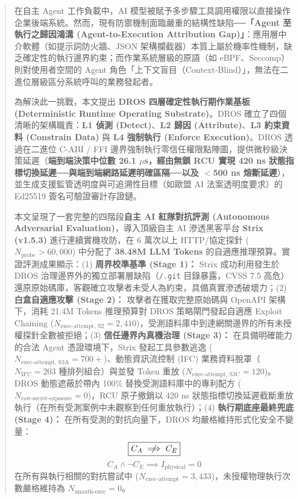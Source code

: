 \documentclass[conference]{IEEEtran}
\begin{document}
\begin{abstract}
在自主 Agent 工作負載中，AI 模型被賦予多步驟工具調用權限以直接操作企業後端系統。然而，現有防禦機制面臨嚴重的結構性缺陷──\textbf{「Agent 至執行之歸因鴻溝 (Agent-to-Execution Attribution Gap)」}：應用層中介軟體（如提示詞防火牆、JSON 架構攔截器）本質上屬於機率性機制，缺乏確定性的執行邊界約束；而作業系統層級的原語（如 eBPF、Seccomp）則對使用者空間的 Agent 角色「上下文盲目（Context-Blind）」，無法在二進位層級區分系統呼叫的業務發起者。

為解決此一挑戰，本文提出 \textbf{DROS 四層確定性執行期作業基板 (Deterministic Runtime Operating Substrate)}。DROS 確立了四個清晰的架構職責：\textbf{L1 偵測 (Detect)}、\textbf{L2 歸因 (Attribute)}、\textbf{L3 約束資料 (Constrain Data)} 與 \textbf{L4 強制執行 (Enforce Execution)}。DROS 透過在二進位 C-ABI / FFI 邊界強制執行零信任權限點陣圖，提供微秒級決策延遲（\textbf{端到端決策中位數 26.1 $\mu$s，經由無鎖 RCU 實現 420 ns 狀態指標切換延遲──與端到端網路延遲明確區隔──以及 $<$500 ns 熔斷延遲}），並生成支援監管透明度與可追溯性目標（如歐盟 AI 法案透明度要求）的 Ed25519 簽名可驗證審計存證鏈。

本文呈現了一套完整的四階段\textbf{自主 AI 紅隊對抗評測 (Autonomous Adversarial Evaluation)}，導入頂級自主 AI 滲透黑客平台 \textbf{Strix (v1.5.3)} 進行連續實機攻防，在 6 萬次以上 HTTP/協定探針 ($N_{\text{probe}} > 60,000$) 中分配了 \textbf{38.48M LLM Tokens} 的自適應推理預算。實證評測成果顯示：(1) \textbf{周界校準基準 (Stage 1)：} Strix 成功利用發生於 DROS 治理邊界外的獨立部署層缺陷（\texttt{/.git} 目錄暴露，CVSS 7.5 高危）還原原始碼庫，客觀確立攻擊者未受人為約束，具備真實滲透破壞力；(2) \textbf{白盒自適應攻擊 (Stage 2)：} 攻擊者在獲取完整原始碼與 OpenAPI 架構下，消耗 21.4M Tokens 推理預算對 DROS 策略閘門發起自適應 Exploit Chaining ($N_{\text{exec-attempt, S2}} = 2,410$)，受測語料庫中到達網關邊界的所有未授權探針全數被拒絕；(3) \textbf{信任邊界內真機治理 (Stage 3)：} 在具備明確能力的合法 Agent 憑證環境下，Strix 發起工具參數逃逸 ($N_{\text{exec-attempt, S3A}} = 700+$)、動態資訊流控制 (IFC) 業務資料脫罩（$N_{\text{IFC}} = 203$ 種排列組合）與並發 Token 重放 ($N_{\text{exec-attempt, S3C}} = 120$)。DROS 動態遮蔽於帶內 100\% 替換受測語料庫中的專利配方 ($N_{\text{raw-secret-exposure}} = 0$)，RCU 原子撤銷以 420 ns 狀態指標切換延遲截斷重放執行（在所有受測案例中未觀察到任何重放執行）；(4) \textbf{執行期底座最終兜底 (Stage 4)：} 在所有受測的對抗向量下，DROS 均嚴格維持形式化安全不變量：
\begin{equation}
\boxed{C_A \centernot\implies C_E}
\end{equation}
\begin{equation}
C_A \land \neg C_E \implies I_{\text{physical}} = 0
\end{equation}
在所有與執行相關的對抗嘗試中 ($N_{\text{exec-attempt}} = 3,433$)，未授權物理執行次數嚴格維持為 $N_{\text{unauth-exec}} = 0$。
\end{abstract}
\end{document}
